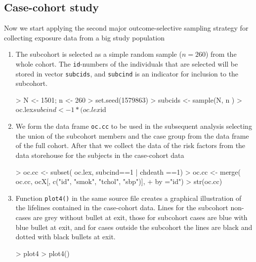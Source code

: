 \subsection{Case-cohort study}

Now we start applying the second major outcome-selective 
sampling strategy
for collecting exposure data from a big study population

\begin{enumerate}[resume]

\item
The subcohort is selected as a  
  simple random sample ($n=260$) from the whole cohort.
The {\tt id}-numbers of the individuals that are 
selected will be stored in vector {\tt subcids}, and
{\tt subcind} is an indicator for inclusion to the subcohort. 
\begin{Schunk}
\begin{Sinput}
> N <- 1501; n <- 260
> set.seed(1579863)
> subcids <- sample(N, n )
> oc.lex$subcind <- 1*(oc.lex$id %in% subcids)
\end{Sinput}
\end{Schunk}

\item
We form the data frame {\tt oc.cc}
 to be used in the subsequent 
analysis selecting the union of the subcohort members 
and the case group from the data frame of the full cohort.
After that we collect the data of the risk factors from the
data storehouse for the  subjects in the case-cohort data 
\begin{Schunk}
\begin{Sinput}
> oc.cc <- subset( oc.lex, subcind==1 | chdeath ==1)
> oc.cc <- merge( oc.cc, ocX[, c("id", "smok", "tchol", "sbp")], 
+    by ="id")
> str(oc.cc) 
\end{Sinput}
\end{Schunk}

\item Function {\tt plot4()} in the same source file
creates a graphical illustration of 
 the lifelines contained in the case-cohort data.
Lines for the subcohort non-cases are grey without bullet at exit,
those for subcohort cases are blue with blue bullet at exit, and
for cases outside the subcohort the lines are black and dotted with
black bullets at exit. 
\begin{Schunk}
\begin{Sinput}
> plot4
> plot4()
\end{Sinput}
\end{Schunk}


\end{enumerate}

